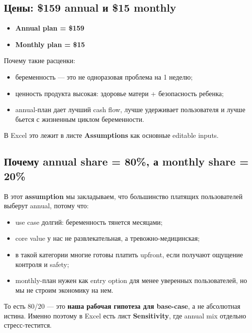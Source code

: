 \documentclass[10pt,a4paper]{article}
\begin{document}
\subsection{Цены: \$159 annual и \$15 monthly}

\begin{softbox}
\begin{itemize}
    \item \textbf{Annual plan = \$159}
    \item \textbf{Monthly plan = \$15}
\end{itemize}
\end{softbox}

Почему такие расценки:
\begin{itemize}
    \item беременность --- это не одноразовая проблема на 1 неделю;
    \item ценность продукта высокая: здоровье матери + безопасность ребенка;
    \item annual-план дает лучший cash flow, лучше удерживает пользователя и лучше бьется с жизненным циклом беременности.
\end{itemize}

В Excel это лежит в листе \textbf{Assumptions} как основные editable inputs.

\subsection{Почему annual share = 80\%, а monthly share = 20\%}

В этот \textbf{assumption} мы закладываем, что большинство платящих пользователей выберут annual, потому что:

\begin{itemize}
    \item use case долгий: беременность тянется месяцами;
    \item core value у нас не развлекательная, а тревожно-медицинская;
    \item в такой категории многие готовы платить upfront, если получают ощущение контроля и safety;
    \item monthly-план нужен как entry option для менее уверенных пользователей, но мы не строим экономику на нем.
\end{itemize}

То есть 80/20 --- это \textbf{наша рабочая гипотеза для base-case}, а не абсолютная истина. Именно поэтому в Excel есть лист \textbf{Sensitivity}, где annual mix отдельно стресс-тестится.
\end{document}
